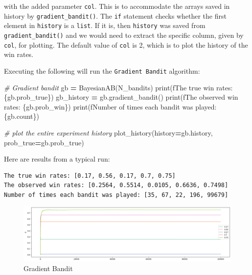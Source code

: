 \documentclass[
]{book}
\newenvironment{Shaded}{\begin{snugshade}}{\end{snugshade}}
\newcommand{\BuiltInTok}[1]{#1}
\newcommand{\CommentTok}[1]{\textcolor[rgb]{0.56,0.35,0.01}{\textit{#1}}}
\newcommand{\NormalTok}[1]{#1}
\newcommand{\OperatorTok}[1]{\textcolor[rgb]{0.81,0.36,0.00}{\textbf{#1}}}
\newcommand{\SpecialCharTok}[1]{\textcolor[rgb]{0.00,0.00,0.00}{#1}}
\newcommand{\SpecialStringTok}[1]{\textcolor[rgb]{0.31,0.60,0.02}{#1}}
\theoremstyle{definition}
\theoremstyle{definition}
\theoremstyle{definition}
\theoremstyle{definition}
\theoremstyle{remark}
\begin{document}
with the added parameter \texttt{col}. This is to accommodate the arrays saved in history by \texttt{gradient\_bandit()}. The \texttt{if} statement checks whether the first element in \texttt{history} is a \texttt{list}. If it is, then \texttt{history} was saved from \texttt{gradient\_bandit()} and we would need to extract the specific column, given by \texttt{col}, for plotting. The default value of \texttt{col} is 2, which is to plot the history of the win rates.

Executing the following will run the \texttt{Gradient\ Bandit} algorithm:

\begin{Shaded}
\begin{Highlighting}[]
\CommentTok{\# Gradient bandit}
\NormalTok{gb }\OperatorTok{=}\NormalTok{ BayesianAB(N\_bandits)}
\BuiltInTok{print}\NormalTok{(}\SpecialStringTok{f\textquotesingle{}The true win rates: }\SpecialCharTok{\{}\NormalTok{gb}\SpecialCharTok{.}\NormalTok{prob\_true}\SpecialCharTok{\}}\SpecialStringTok{\textquotesingle{}}\NormalTok{)}
\NormalTok{gb\_history }\OperatorTok{=}\NormalTok{ gb.gradient\_bandit()}
\BuiltInTok{print}\NormalTok{(}\SpecialStringTok{f\textquotesingle{}The observed win rates: }\SpecialCharTok{\{}\NormalTok{gb}\SpecialCharTok{.}\NormalTok{prob\_win}\SpecialCharTok{\}}\SpecialStringTok{\textquotesingle{}}\NormalTok{)}
\BuiltInTok{print}\NormalTok{(}\SpecialStringTok{f\textquotesingle{}Number of times each bandit was played: }\SpecialCharTok{\{}\NormalTok{gb}\SpecialCharTok{.}\NormalTok{count}\SpecialCharTok{\}}\SpecialStringTok{\textquotesingle{}}\NormalTok{)}

\CommentTok{\# plot the entire experiment history}
\NormalTok{plot\_history(history}\OperatorTok{=}\NormalTok{gb.history, prob\_true}\OperatorTok{=}\NormalTok{gb.prob\_true)}
\end{Highlighting}
\end{Shaded}

Here are results from a typical run:

\begin{verbatim}
The true win rates: [0.17, 0.56, 0.17, 0.7, 0.75]
The observed win rates: [0.2564, 0.5514, 0.0105, 0.6636, 0.7498]
Number of times each bandit was played: [35, 67, 22, 196, 99679]
\end{verbatim}

\begin{figure}
\centering
\includegraphics{images/gb.png}
\caption{Gradient Bandit}
\end{figure}
\end{document}
